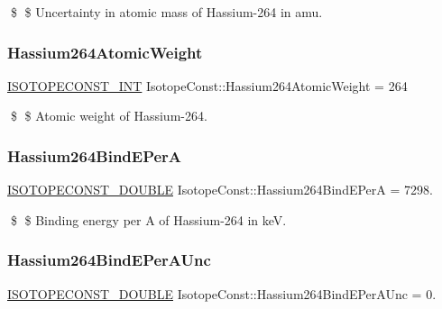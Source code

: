 \$ \$ Uncertainty in atomic mass of Hassium-\/264 in amu. \mbox{\label{group___isotope_const-_hassium-_hs264_gad739ce7ccdd1d90f866b6da18ab65366}} 
\subsubsection{\texorpdfstring{Hassium264\+Atomic\+Weight}{Hassium264AtomicWeight}}
{\footnotesize\ttfamily \mbox{\hyperlink{group___isotope_const-_macros_ga5f18360b3e99483a35c32d789e62621c}{I\+S\+O\+T\+O\+P\+E\+C\+O\+N\+S\+T\+\_\+\+I\+NT}} Isotope\+Const\+::\+Hassium264\+Atomic\+Weight = 264}

\$ \$ Atomic weight of Hassium-\/264. \mbox{\label{group___isotope_const-_hassium-_hs264_ga2864a2673c44e2d28a93ead4a313ff30}} 
\subsubsection{\texorpdfstring{Hassium264\+Bind\+E\+PerA}{Hassium264BindEPerA}}
{\footnotesize\ttfamily \mbox{\hyperlink{group___isotope_const-_macros_ga8f45a7272ce02c0b4c65c44636ed719a}{I\+S\+O\+T\+O\+P\+E\+C\+O\+N\+S\+T\+\_\+\+D\+O\+U\+B\+LE}} Isotope\+Const\+::\+Hassium264\+Bind\+E\+PerA = 7298.}

\$ \$ Binding energy per A of Hassium-\/264 in keV. \mbox{\label{group___isotope_const-_hassium-_hs264_ga9d9c63827ec61c8e67e0cff4f7320238}} 
\subsubsection{\texorpdfstring{Hassium264\+Bind\+E\+Per\+A\+Unc}{Hassium264BindEPerAUnc}}
{\footnotesize\ttfamily \mbox{\hyperlink{group___isotope_const-_macros_ga8f45a7272ce02c0b4c65c44636ed719a}{I\+S\+O\+T\+O\+P\+E\+C\+O\+N\+S\+T\+\_\+\+D\+O\+U\+B\+LE}} Isotope\+Const\+::\+Hassium264\+Bind\+E\+Per\+A\+Unc = 0.}


